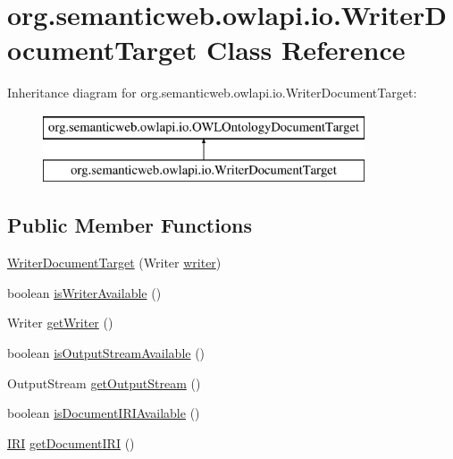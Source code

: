 \hypertarget{classorg_1_1semanticweb_1_1owlapi_1_1io_1_1_writer_document_target}{\section{org.\-semanticweb.\-owlapi.\-io.\-Writer\-Document\-Target Class Reference}
\label{classorg_1_1semanticweb_1_1owlapi_1_1io_1_1_writer_document_target}
}
Inheritance diagram for org.\-semanticweb.\-owlapi.\-io.\-Writer\-Document\-Target\-:\begin{figure}[H]
\begin{center}
\leavevmode
\includegraphics[height=2.000000cm]{classorg_1_1semanticweb_1_1owlapi_1_1io_1_1_writer_document_target}
\end{center}
\end{figure}
\subsection*{Public Member Functions}
\begin{DoxyCompactItemize}
\item 
\hyperlink{classorg_1_1semanticweb_1_1owlapi_1_1io_1_1_writer_document_target_ad2f06e07a429f8182bd6b109403622dc}{Writer\-Document\-Target} (Writer \hyperlink{classorg_1_1semanticweb_1_1owlapi_1_1io_1_1_writer_document_target_a927062bdac416c24a01b3f5effb51cd3}{writer})
\item 
boolean \hyperlink{classorg_1_1semanticweb_1_1owlapi_1_1io_1_1_writer_document_target_a994717e4987baae07f481fac0e8351bb}{is\-Writer\-Available} ()
\item 
Writer \hyperlink{classorg_1_1semanticweb_1_1owlapi_1_1io_1_1_writer_document_target_a16fb4aa8d2c7ff3d66b604796606df26}{get\-Writer} ()
\item 
boolean \hyperlink{classorg_1_1semanticweb_1_1owlapi_1_1io_1_1_writer_document_target_ac3a0f396fe70d6e7cf20dc00f060a397}{is\-Output\-Stream\-Available} ()
\item 
Output\-Stream \hyperlink{classorg_1_1semanticweb_1_1owlapi_1_1io_1_1_writer_document_target_a357644300a653bc4cf720f4a535f387a}{get\-Output\-Stream} ()
\item 
boolean \hyperlink{classorg_1_1semanticweb_1_1owlapi_1_1io_1_1_writer_document_target_aee2f654dbd5f5eb312e59a826a9caf4c}{is\-Document\-I\-R\-I\-Available} ()
\item 
\hyperlink{classorg_1_1semanticweb_1_1owlapi_1_1model_1_1_i_r_i}{I\-R\-I} \hyperlink{classorg_1_1semanticweb_1_1owlapi_1_1io_1_1_writer_document_target_a5a3df5ee245927222b71ba8a060d242e}{get\-Document\-I\-R\-I} ()
\end{DoxyCompactItemize}
